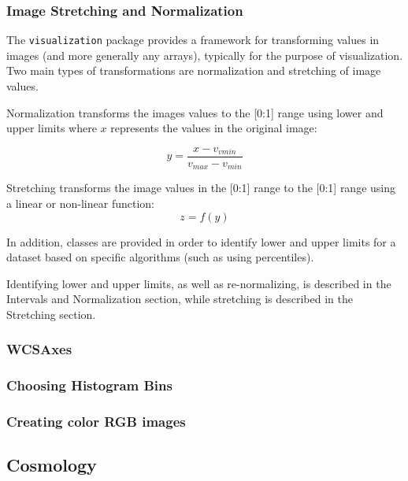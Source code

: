 \documentclass[modern]{aastex61}
\newcommand{\package}[1]{\texttt{#1}}
\begin{document}
\subsubsection{Image Stretching and Normalization}

The \package{visualization} package provides a framework for transforming values in images (and more generally any arrays), typically for the purpose of visualization. Two main types of transformations are normalization and stretching of image values.

Normalization transforms the images values to the [0:1] range using lower and upper limits where $x$ represents the values in the original image:

\begin{equation}
y = \frac{x - v_{vmin}}{v_{max} − v_{min}}
\end{equation}

Stretching transforms the image values in the [0:1] range to the [0:1] range using a linear or non-linear function:
\begin{equation}
z = f(y)
\end{equation}

In addition, classes are provided in order to identify lower and upper limits for a dataset based on specific algorithms (such as using percentiles).

Identifying lower and upper limits, as well as re-normalizing, is described in the Intervals and Normalization section, while stretching is described in the Stretching section.

\subsubsection{WCSAxes}

\subsubsection{Choosing Histogram Bins}

\subsubsection{Creating color RGB images}


\subsection{Cosmology}
\end{document}
